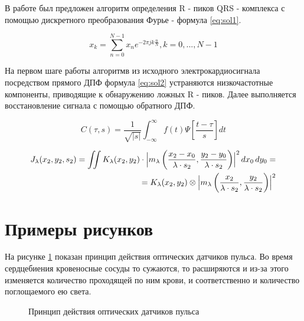 \documentclass[a4paper,12pt]{article}         %
\begin{document}
В работе \cite{gothwal2011cardiac} был предложен алгоритм определения R - пиков QRS - комплекса с помощью дискретного преобразования Фурье - формула \ref{eq:sol1}.

\begin{equation}\label{eq:sol1}
x_{k}=\sum_{n=0}^{N-1}x_{n}e^{-2\pi jk\frac{n}{N}}, k = 0, ..., N-1
\end{equation}

На первом шаге работы алгоритмв из исходного электрокардиосигнала посредством прямого ДПФ формула \ref{eq:sol2} устраняются низкочастотные компоненты, приводящие к обнаружению ложных R - пиков. Далее выполняется восстановление сигнала с помощью обратного ДПФ.

\begin{equation}\label{eq:sol2}
C(\tau , s) = \frac{1}{\sqrt{\left |s  \right |}}\int_{-\infty }^{\infty }f(t)\Psi \left [ \frac{t-\tau}{s}  \right ]dt
\end{equation}


\begin{eqnarray}\label{eq:sol3}
J_\lambda(x_2, y_2, s_2) =
\iint K_\lambda(x_2, y_2) \cdot \Bigl| m_\lambda
\left(
\frac{x_2-x_0}{\lambda \cdot s_2} , \frac{y_2-y_0}{\lambda \cdot s_2}\right)\Bigr|^2 \,dx_0\,dy_0 = \nonumber \\
= K_\lambda(x_2, y_2) \otimes \Bigl| m_\lambda \left( \frac{x_2}{\lambda \cdot s_2} , \frac{y_2}{\lambda \cdot s_2} \right) \Bigr|^2
\end{eqnarray}

\newpage
\section{Примеры рисунков}

На рисунке \ref{fig:i1} показан принцип действия оптических датчиков пульса. Во время сердцебиения кровеносные сосуды то сужаются, то расширяются и из-за этого изменяется количество проходящей по ним крови, и соответственно и количество поглощаемого ею света.

\begin{figure}[h]
	\caption{Принцип действия оптических датчиков пульса}
	\label{fig:i1}
\end{figure}
\end{document}
